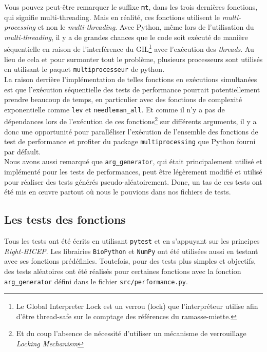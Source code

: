 \documentclass[12pt]{article}
\begin{document}
Vous pouvez peut-être remarquer le suffixe \texttt{mt}, dans les trois dernières fonctions, qui signifie multi-threading. Mais en réalité, ces fonctions utilisent le \textsl{multi-processing} et non le \textsl{multi-threading}. Avec Python, même lors de l'utilisation du \textsl{multi-threading}, il y a de grandes chances que le code soit exécuté de manière séquentielle en raison de l'interférence du GIL\footnote{Le Global Interpreter Lock est un verrou (lock) que l’interpréteur utilise afin d’être thread-safe sur le comptage des références du ramasse-miette.} avec l'exécution des \textsl{threads}. Au lieu de cela et pour surmonter tout le problème, plusieurs processeurs sont utilisés en utilisant le paquet \texttt{multiprocesseur} de python.\\
La raison derrière l'implémentation de telles fonctions en exécutions simultanées est que l'exécution séquentielle des tests de performance pourrait potentiellement prendre beaucoup de temps, en particulier avec des fonctions de complexité exponentielle comme \texttt{lev} et \texttt{needleman\_all}. Et comme il n'y a pas de dépendances lors de l'exécution de ces fonctions\footnote{Et du coup l'absence de nécessité d'utiliser un mécanisme de verrouillage \textsl{Locking Mechanism}} sur différents arguments, il y a donc une opportunité pour paralléliser l'exécution de l'ensemble des fonctions de test de performance et profiter du package \texttt{multiprocessing} que Python fourni par défault. \\
Nous avons aussi remarqué que \texttt{arg\_generator}, qui était principalement utilisé et implémenté pour les tests de performances, peut être légèrement modifié et utilisé pour réaliser des tests générés pseudo-aléatoirement. Donc, un tas de ces tests ont été mis en œuvre partout où nous le pouvions dans nos fichiers de tests.



\subsection{Les tests des fonctions}
Tous les tests ont été écrits en utilisant \texttt{pytest} et en s'appuyant sur les principes \textit{Right-BICEP}. 
Les librairies \texttt{BioPython} et \texttt{NumPy} ont été utilisées aussi en testant avec ses fonctions prédéfinies. Toutefois, pour des tests plus simples et objectifs, des tests aléatoires ont été réalisés pour certaines fonctions avec la fonction \texttt{arg\_generator} défini dans le fichier \texttt{src/performance.py}.
\end{document}
